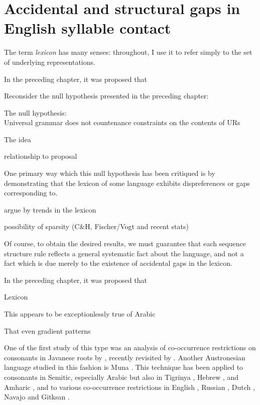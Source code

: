 \chapter{Accidental and structural gaps in English syllable contact}
\label{clusters}



The term \emph{lexicon} has many senses: throughout, I use it to refer simply to the set of underlying representations.

In the preceding chapter, it was proposed that 

Reconsider the null hypothesis presented in the preceding chapter:

\begin{example}
The null hypothesis: \\
Universal grammar does not countenance constraints on the contents of URs
\end{example}

The idea 

relationship to proposal

One primary way which this null hypothesis has been critiqued is by demonstrating that the lexicon of some language 
exhibits dispreferences or gaps corresponding to.

argue by trends in the lexicon

possibility of sparsity (C\&H, Fischer/Vogt and recent stats)

Of course, to obtain the desired results, we must guarantee that each sequence structure rule reflects a general systematic fact about the language, and not a fact which is due merely to the existence of accidental gaps in the lexicon. \citep[][401, fn.~8]{Stanley1967}

In the preceding chapter, it was proposed that 

Lexicon

This appears to be exceptionlessly true of Arabic

That even gradient patterns 

One of the first study of this type was an analysis of co-occurrence restrictions on consonants in Javanese roots by \citet{Mester1988}, recently revisited by \citet{Graff2011}. 
Another Austronesian language studied in this fashion is Muna \citep{Coetzee2008a,Anttila2008}.
This technique has been applied to consonants in Semitic, especially Arabic \citep{McCarthy1988,McCarthy1994,Pierrehumbert1993,Frisch1996,Frisch2004,Coetzee2008a} but also in Tigrinya \citep{Buckley1997}, Hebrew \citep{Berent2003}, and Amharic \citep{Colavin2010}, and to various co-occurrence restrictions in English \citep{Berkley1994b,Berkley1994a,Pierrehumbert1994,Dmitrieva2008a,Dmitrieva2008b,Coetzee2008b}, Russian \citep{Padgett1992}, Dutch \citep{Graff2011}, Navajo \citep{Martin2007,Martin2011} and Gitksan \citep{Brown2010}.

